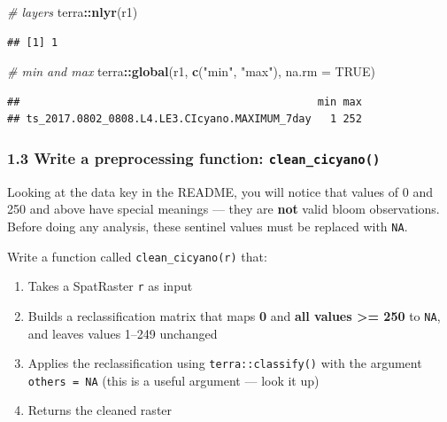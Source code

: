 \documentclass[
]{article}
\newenvironment{Shaded}{\begin{snugshade}}{\end{snugshade}}
\newcommand{\AttributeTok}[1]{\textcolor[rgb]{0.13,0.29,0.53}{#1}}
\newcommand{\CommentTok}[1]{\textcolor[rgb]{0.56,0.35,0.01}{\textit{#1}}}
\newcommand{\ConstantTok}[1]{\textcolor[rgb]{0.56,0.35,0.01}{#1}}
\newcommand{\FunctionTok}[1]{\textcolor[rgb]{0.13,0.29,0.53}{\textbf{#1}}}
\newcommand{\NormalTok}[1]{#1}
\newcommand{\SpecialCharTok}[1]{\textcolor[rgb]{0.81,0.36,0.00}{\textbf{#1}}}
\newcommand{\StringTok}[1]{\textcolor[rgb]{0.31,0.60,0.02}{#1}}
\providecommand{\tightlist}{%
  \setlength{\itemsep}{0pt}\setlength{\parskip}{0pt}}
\begin{document}
\begin{Shaded}
\begin{Highlighting}[]
\CommentTok{\# layers}
\NormalTok{terra}\SpecialCharTok{::}\FunctionTok{nlyr}\NormalTok{(r1)}
\end{Highlighting}
\end{Shaded}

\begin{verbatim}
## [1] 1
\end{verbatim}

\begin{Shaded}
\begin{Highlighting}[]
\CommentTok{\# min and max}
\NormalTok{terra}\SpecialCharTok{::}\FunctionTok{global}\NormalTok{(r1, }\FunctionTok{c}\NormalTok{(}\StringTok{"min"}\NormalTok{, }\StringTok{"max"}\NormalTok{), }\AttributeTok{na.rm =} \ConstantTok{TRUE}\NormalTok{)}
\end{Highlighting}
\end{Shaded}

\begin{verbatim}
##                                               min max
## ts_2017.0802_0808.L4.LE3.CIcyano.MAXIMUM_7day   1 252
\end{verbatim}

\hypertarget{write-a-preprocessing-function-clean_cicyano}{%
\subsubsection{\texorpdfstring{1.3 Write a preprocessing function:
\texttt{clean\_cicyano()}}{1.3 Write a preprocessing function: clean\_cicyano()}}\label{write-a-preprocessing-function-clean_cicyano}}

Looking at the data key in the README, you will notice that values of 0
and 250 and above have special meanings --- they are \textbf{not} valid
bloom observations. Before doing any analysis, these sentinel values
must be replaced with \texttt{NA}.

Write a function called \texttt{clean\_cicyano(r)} that:

\begin{enumerate}
\def\labelenumi{\arabic{enumi}.}
\tightlist
\item
  Takes a SpatRaster \texttt{r} as input
\item
  Builds a reclassification matrix that maps \textbf{0} and \textbf{all
  values \textgreater= 250} to \texttt{NA}, and leaves values 1--249
  unchanged
\item
  Applies the reclassification using \texttt{terra::classify()} with the
  argument \texttt{others\ =\ NA} (this is a useful argument --- look it
  up)
\item
  Returns the cleaned raster
\end{enumerate}
\end{document}
